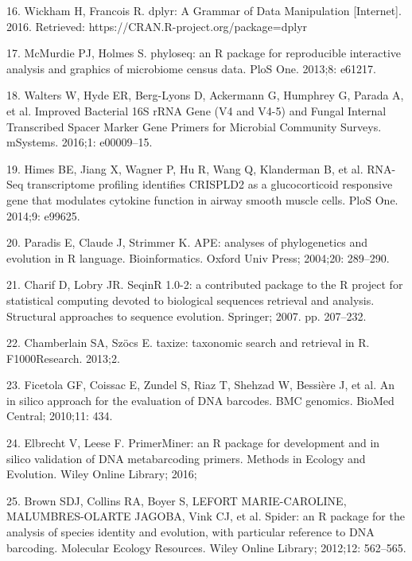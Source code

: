 \documentclass[10pt,letterpaper]{article}
\begin{document}
\label{csl:16}16. Wickham H, Francois R. {dplyr: A Grammar of Data Manipulation} [Internet]. 2016. Retrieved: https://CRAN.R-project.org/package=dplyr

\label{csl:17}17. McMurdie PJ, Holmes S. {phyloseq: an R package for reproducible interactive analysis and graphics of microbiome census data}. PloS One. 2013;8: e61217.

\label{csl:18}18. Walters W, Hyde ER, Berg-Lyons D, Ackermann G, Humphrey G, Parada A, et al. {Improved Bacterial 16S rRNA Gene (V4 and V4-5) and Fungal Internal Transcribed Spacer Marker Gene Primers for Microbial Community Surveys}. mSystems. 2016;1: e00009–15.

\label{csl:19}19. Himes BE, Jiang X, Wagner P, Hu R, Wang Q, Klanderman B, et al. {RNA-Seq transcriptome profiling identifies CRISPLD2 as a glucocorticoid responsive gene that modulates cytokine function in airway smooth muscle cells}. PloS One. 2014;9: e99625.

\label{csl:20}20. Paradis E, Claude J, Strimmer K. {APE: analyses of phylogenetics and evolution in R language}. Bioinformatics. Oxford Univ Press; 2004;20: 289–290.

\label{csl:21}21. Charif D, Lobry JR. {SeqinR 1.0-2: a contributed package to the R project for statistical computing devoted to biological sequences retrieval and analysis}. Structural approaches to sequence evolution. Springer; 2007. pp. 207–232.

\label{csl:22}22. Chamberlain SA, Sz{\"o}cs E. {taxize: taxonomic search and retrieval in R}. F1000Research. 2013;2.

\label{csl:23}23. Ficetola GF, Coissac E, Zundel S, Riaz T, Shehzad W, Bessi{\`e}re J, et al. {An in silico approach for the evaluation of DNA barcodes}. BMC genomics. BioMed Central; 2010;11: 434.

\label{csl:24}24. Elbrecht V, Leese F. {PrimerMiner: an R package for development and in silico validation of DNA metabarcoding primers}. Methods in Ecology and Evolution. Wiley Online Library; 2016;

\label{csl:25}25. Brown SDJ, Collins RA, Boyer S, LEFORT MARIE-CAROLINE, MALUMBRES-OLARTE JAGOBA, Vink CJ, et al. {Spider: an R package for the analysis of species identity and evolution, with particular reference to DNA barcoding}. Molecular Ecology Resources. Wiley Online Library; 2012;12: 562–565.
\end{document}
